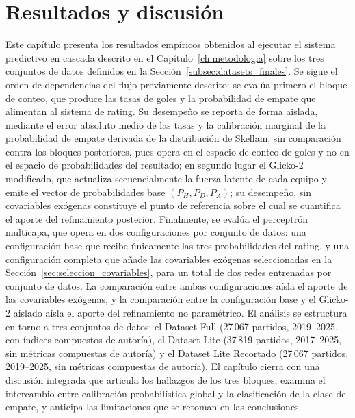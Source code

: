 \chapter{Resultados y discusi\'on}
\label{ch:resultados}

Este cap\'itulo presenta los resultados emp\'iricos obtenidos al ejecutar el sistema predictivo en cascada descrito en el Cap\'itulo~\ref{ch:metodologia} sobre los tres conjuntos de datos definidos en la Secci\'on~\ref{subsec:datasets_finales}. Se sigue el orden de dependencias del flujo previamente descrito: se eval\'ua primero el bloque de conteo, que produce las tasas de goles y la probabilidad de empate que alimentan al sistema de rating. Su desempe\~no se reporta de forma aislada, mediante el error absoluto medio de las tasas y la calibraci\'on marginal de la probabilidad de empate derivada de la distribuci\'on de Skellam, sin comparaci\'on contra los bloques posteriores, pues opera en el espacio de conteo de goles y no en el espacio de probabilidades del resultado; en segundo lugar el Glicko-2 modificado, que actualiza secuencialmente la fuerza latente de cada equipo y emite el vector de probabilidades base $(P_H, P_D, P_A)$; su desempe\~no, sin covariables ex\'ogenas constituye el punto de referencia sobre el cual se cuantifica el aporte del refinamiento posterior. Finalmente, se eval\'ua el perceptr\'on multicapa, que opera en dos configuraciones por conjunto de datos: una configuraci\'on base que recibe \'unicamente las tres probabilidades del rating, y una configuraci\'on completa que a\~nade las covariables ex\'ogenas seleccionadas en la Secci\'on~\ref{sec:seleccion_covariables}, para un total de dos redes entrenadas por conjunto de datos. La comparaci\'on entre ambas configuraciones a\'isla el aporte de las covariables ex\'ogenas, y la comparaci\'on entre la configuraci\'on base y el Glicko-2 aislado a\'isla el aporte del refinamiento no param\'etrico. El an\'alisis se estructura en torno a tres conjuntos de datos: el Dataset Full (27\,067 partidos, 2019--2025, con \'indices compuestos de autor\'ia), el Dataset Lite (37\,819 partidos, 2017--2025, sin m\'etricas compuestas de autor\'ia) y el Dataset Lite Recortado (27\,067 partidos, 2019--2025, sin m\'etricas compuestas de autor\'ia). El cap\'itulo cierra con una discusi\'on integrada que articula los hallazgos de los tres bloques, examina el intercambio entre calibraci\'on probabil\'istica global y la clasificaci\'on de la clase del empate, y anticipa las limitaciones que se retoman en las conclusiones.

